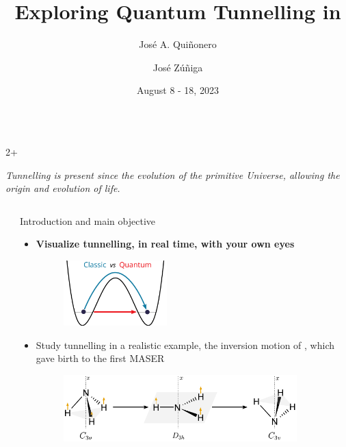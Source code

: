 \documentclass[final]{beamer}
\title{Exploring Quantum Tunnelling in \ch{NH3}}
\author{José A. Quiñonero
	\and José Zúñiga
}
\institute[shortinst]{Departamento de Química Física, Universidad de Murcia}
\date{August 8 - 18, 2023}
\newcommand{\sepvert}{0.5cm}
\newlength{\sepwidth}
\newlength{\colwidth}
\newcommand{\separatorcolumn}{\begin{column}{\sepwidth}\end{column}}
\begin{document}
	
\begin{frame}[t]
	
	\begin{columns}[t]

		\begin{column}{2\colwidth+\sepwidth}

		\textit{Tunnelling is present since the evolution of the primitive Universe,
		allowing the origin and evolution of life.}

		\end{column}

	\end{columns}

	\begin{columns}[t]
		\separatorcolumn
		
		\begin{column}{\colwidth}

			\begin{block}{Introduction and main objective}
				\begin{itemize}
					\item \textbf{Visualize tunnelling, in real time, with your own eyes}

						\vspace{\sepvert}
						\begin{figure}[tb!]
							\centering
							\includegraphics[width=0.4\textwidth]{figures/classic-vs-quantum.pdf}
						\end{figure}
						\vspace{\sepvert}

					\item Study tunnelling in a realistic example, the inversion motion of
						, which gave birth to the first MASER

						\vspace{\sepvert}
						\begin{figure}[tb!]
							\centering
							\includegraphics[width=0.9\textwidth]{figures/esquema_inversion.pdf}
						\end{figure}
						\vspace{\sepvert}


\end{itemize}
\end{block}
\end{column}
\end{columns}
\end{frame}
\end{document}
